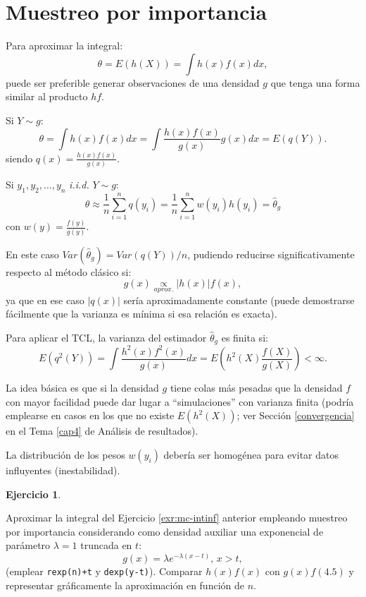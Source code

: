 \documentclass[
]{book}
\theoremstyle{break}
\theoremstyle{definition}
\theoremstyle{definition}
\theoremstyle{definition}
\newtheorem{exercise}{Ejercicio}[chapter]
\theoremstyle{definition}
\theoremstyle{remark}
\begin{document}
\hypertarget{muestreo-importancia}{%
\section{Muestreo por importancia}\label{muestreo-importancia}}

Para aproximar la integral:
\[\theta = E\left( h\left( X\right) \right) = \int h\left( x\right) f(x)dx,\]
puede ser preferible generar observaciones de una densidad \(g\)
que tenga una forma similar al producto \(hf\).

Si \(Y\sim g\):
\[\theta  = \int h\left( x\right) f(x)dx 
 = \int \frac{h\left( x\right) f(x)}{g(x)}g(x)dx
 = E\left( q\left( Y\right) \right).\]
siendo
\(q\left( x\right) = \frac{h\left( x\right) f(x)}{g(x)}\).

Si \(y_1,y_2,\ldots ,y_n\) \emph{i.i.d.} \(Y\sim g\):
\[\theta \approx \frac{1}{n}\sum\limits_{i=1}^nq\left( y_i\right) 
= \frac{1}{n}\sum\limits_{i=1}^nw(y_i)h\left( y_i\right)  
= \hat{\theta}_{g}\]
con \(w(y) = \frac{f(y)}{g(y)}\).

En este caso \(Var(\hat{\theta}_{g}) = Var\left( q\left( Y\right) \right) /n\),
pudiendo reducirse significativamente respecto al método clásico si:
\[g(x)\underset{aprox.}{\propto } \left\vert h(x) \right\vert f(x),\]
ya que en ese caso \(\left\vert q(x) \right\vert\) sería aproximadamente constante
(puede demostrarse fácilmente que la varianza es mínima si esa relación es exacta).

Para aplicar el TCL, la varianza del estimador \(\hat{\theta}_{g}\)
es finita si:
\[E\left( q^2\left( Y\right) \right)  
= \int \frac{h^2\left( x\right)f^2(x)}{g(x)}dx 
= E\left( h^2\left( X\right) \frac{f(X)}{g(X)}\right)
< \infty.\]

La idea básica es que si la densidad \(g\) tiene colas más pesadas que
la densidad \(f\) con mayor facilidad puede dar lugar a
``simulaciones'' con varianza finita
(podría emplearse en casos en los que no existe
\(E \left( h^2 \left( X \right) \right)\);
ver Sección \ref{convergencia} en el Tema \ref{cap4} de Análisis de resultados).

La distribución de los pesos \(w(y_i)\) debería ser homogénea para
evitar datos influyentes (inestabilidad).

\begin{exercise}
\protect\hypertarget{exr:mc-imp}{}{\label{exr:mc-imp} }
\end{exercise}

Aproximar la integral del Ejercicio \ref{exr:mc-intinf} anterior empleando muestreo por importancia considerando como densidad auxiliar una exponencial de parámetro \(\lambda=1\) truncada en \(t\):
\[g\left(  x\right)  =\lambda e^{-\lambda\left(  x-t\right)  }\text{, }x>t,\]
(emplear \texttt{rexp(n)+t} y \texttt{dexp(y-t)}).
Comparar \(h(x)f(x)\) con \(g(x)f(4.5)\) y representar gráficamente la
aproximación en función de \(n\).
\end{document}
